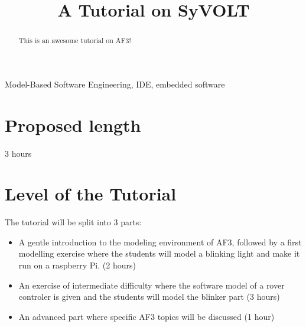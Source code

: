 \documentclass[conference]{IEEEtran}
\begin{document}
 
\title{A Tutorial on SyVOLT\\
}

\author{
\and
{}
}

\maketitle 

\begin{abstract}
This is an awesome tutorial on AF3! 
\end{abstract}

\begin{IEEEkeywords}
Model-Based Software Engineering, IDE, embedded software
\end{IEEEkeywords}

\section{Proposed length}

3 hours

\section{Level of the Tutorial}

The tutorial will be split into 3 parts:

\begin{itemize}
  \item A gentle introduction to the modeling environment of AF3, followed by a
  first modelling exercise where the students will model a blinking light and
  make it run on a raspberry Pi.
  (2 hours) 
  \item An exercise of intermediate difficulty where the software model of a
  rover controler is given and the students will model the blinker part (3
  hours)
  \item An advanced part where specific AF3 topics will be discussed (1 hour)
\end{itemize}
\end{document}
